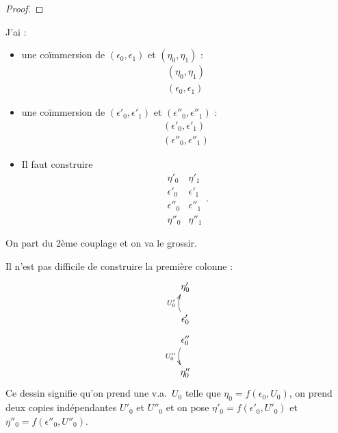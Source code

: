 \documentclass[12pt,a4paper]{article}
\begin{document}
\begin{appendices}
\begin{proof}
\end{proof}

\newpage 

J'ai : 

\begin{itemize}
\item une coïmmersion de $(\epsilon_0, \epsilon_1)$ et $(\eta_0, \eta_1)$ :
$$
\begin{matrix}
(\eta_0, \eta_1) \\
(\epsilon_0,  \epsilon_1)
\end{matrix}
$$

\item une coïmmersion de $(\epsilon'_0, \epsilon'_1)$ et $(\epsilon''_0, \epsilon''_1)$ :
$$
\begin{matrix}
(\epsilon'_0, \epsilon'_1) \\
(\epsilon''_0,  \epsilon''_1)
\end{matrix}
$$
\item Il faut construire
$$
\begin{matrix}
\eta'_0 & \eta'_1 \\
\epsilon'_0 & \epsilon'_1 \\
\epsilon''_0 &  \epsilon''_1 \\
\eta''_0 & \eta''_1
\end{matrix}.
$$
\end{itemize}

On part du 2ème couplage et on va le grossir. 

Il n'est pas difficile de construire la première colonne :
\begin{displaymath}
\xymatrix @R=.5pc{
\eta'_0  \\ \\
\epsilon'_0  \ar@/^.6pc/[uu]^{U'_0}   \\
\epsilon''_0  \ar@/^-.6pc/[dd]_{U''_0}\\ \\
\eta''_0
}
\end{displaymath}
Ce dessin signifie qu'on prend une v.a.\ $U_0$ telle que $\eta_0=f(\epsilon_0,U_0)$, on prend deux copies indépendantes $U'_0$ et $U''_0$ et on pose $\eta'_0=f(\epsilon'_0,U'_0)$ 
et $\eta''_0=f(\epsilon''_0,U''_0)$.


\end{appendices}
\end{document}
